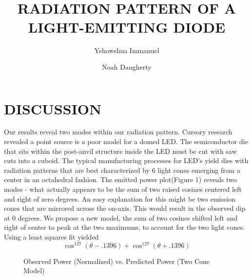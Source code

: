\documentclass[10pt,a4paper]{article}
\title{RADIATION PATTERN OF A LIGHT-EMITTING DIODE}
\author{Yehowshua Immanuel \and Noah Daugherty}
\begin{document}
\maketitle
\tableofcontents
\newpage






\section{DISCUSSION}
Our results reveal two modes within our radiation pattern. Cursory research revealed a point source is a poor model for a domed LED. The semiconductor die that sits within the post-anvil structure inside the LED must be cut with saw cuts into a cuboid. The typical manufacturing processes for LED’s yield dies with radiation patterns that are best characterized by 6 light cones emerging from a center in an octahedral fashion. The emitted power plot(Figure 1) reveals two modes - what actually appears to be the sum of two raised cosines centered left and right of zero degrees. An easy explanation for this might be two emission cones that are mirrored across the on-axis. This would result in the observed dip at 0 degrees. We propose a new model, the sum of two cosines shifted left and right of center to peak at the two maximums, to account for the two light cones. Using a least squares fit yielded
\[\cos^{127}(\theta-.1396) + \cos^{127}(\theta+.1396)\]

\begin{figure}[H]
    \centering
{}
\caption{Observed Power (Normalized) vs. \newline Predicted Power (Two Cone Model)}
\end{figure}

\newpage

\end{document}
